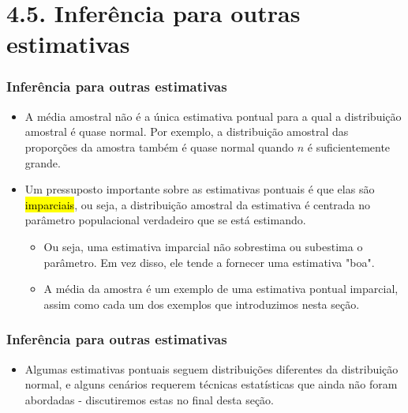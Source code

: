 
\section{4.5. Inferência para outras estimativas}


\begin{frame}
\frametitle{Inferência para outras estimativas}

\begin{itemize}
\justifying
\item A média amostral não é a única estimativa pontual para a qual a distribuição amostral é quase normal. Por exemplo, a distribuição amostral das proporções da amostra também é quase normal quando $ n $ é suficientemente grande.
\justifying
\item Um pressuposto importante sobre as estimativas pontuais é que elas são \hl {imparciais}, ou seja, a distribuição amostral da estimativa é centrada no parâmetro populacional verdadeiro que se está estimando.

\begin{itemize}
\justifying
\item Ou seja, uma estimativa imparcial não sobrestima ou subestima o parâmetro. Em vez disso, ele tende a fornecer uma estimativa "boa".
\justifying
\item A média da amostra é um exemplo de uma estimativa pontual imparcial, assim como cada um dos exemplos que introduzimos nesta seção.
\end{itemize}
\end{itemize}
\end{frame}

\begin{frame}
\frametitle{Inferência para outras estimativas}

\begin{itemize}
\justifying
\item Algumas estimativas pontuais seguem distribuições diferentes da distribuição normal, e alguns cenários requerem técnicas estatísticas que ainda não foram abordadas - discutiremos estas no final desta seção.

\end{itemize}

\end{frame}


